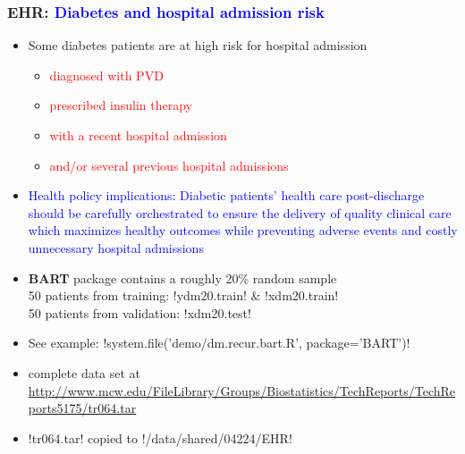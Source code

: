 \documentclass[11pt,pdftex,dvipsnames,usenames,helvetica]{beamer}
\begin{document}
\MakeShortVerb{\!}
\begin{frame}\frametitle{EHR: \textcolor{blue}{Diabetes and hospital
      admission risk }}

\begin{itemize}
\item Some diabetes patients are at high risk for hospital admission
\begin{itemize}
\item \textcolor{red}{diagnosed with PVD}
\item \textcolor{red}{prescribed insulin therapy}
\item \textcolor{red}{with a recent hospital admission}
\item \textcolor{red}{and/or several previous hospital admissions}
\end{itemize}
\item \textcolor{blue}{Health policy implications: Diabetic patients' health
care post-discharge should be carefully orchestrated to ensure the delivery of quality
clinical care which maximizes healthy outcomes while
    preventing adverse events and costly unnecessary hospital admissions}
\item {\bf BART} package contains a roughly 20\% random sample\\
50 patients from training: !ydm20.train! \& !xdm20.train!\\
50 patients from validation: !xdm20.test!
\item See example: !system.file('demo/dm.recur.bart.R', package='BART')!
\item complete data set at
\url{http://www.mcw.edu/FileLibrary/Groups/Biostatistics/TechReports/TechReports5175/tr064.tar}
\item !tr064.tar! copied to !/data/shared/04224/EHR!

\end{itemize}

\end{frame}
\end{document}
